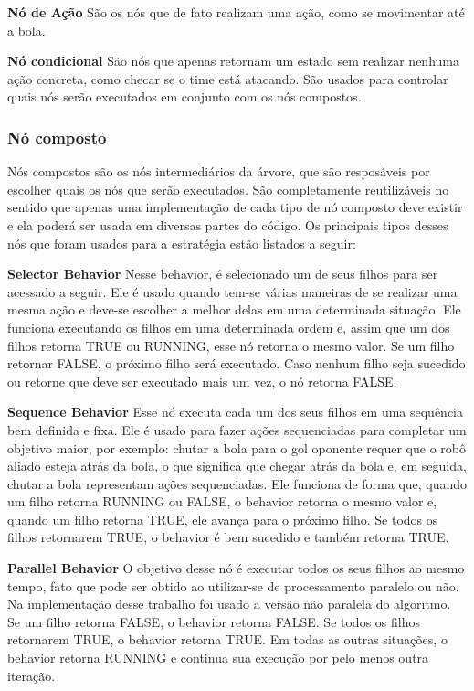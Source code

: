 \documentclass[a4paper,12pt]{article}
\begin{document}
\textbf{Nó de Ação} São os nós que de fato realizam uma ação, como se movimentar até a bola.

\textbf{Nó condicional} São nós que apenas retornam um estado sem realizar nenhuma ação concreta, como checar se o time está atacando. São usados para controlar quais nós serão executados em conjunto com os nós compostos.

\subsubsection{Nó composto}

Nós compostos são os nós intermediários da árvore, que  são resposáveis por escolher quais os nós que serão executados. São completamente reutilizáveis no sentido que apenas uma implementação de cada tipo de nó composto deve existir e ela poderá ser usada em diversas partes do código. Os principais tipos desses nós que foram usados para a estratégia estão listados a seguir:

\textbf{Selector Behavior} Nesse behavior, é selecionado um de seus filhos para ser acessado a seguir. Ele é usado quando tem-se várias maneiras de se realizar uma mesma ação e deve-se escolher a melhor delas em uma determinada situação. Ele funciona executando os filhos em uma determinada ordem e, assim que um dos filhos retorna TRUE ou RUNNING, esse nó retorna o mesmo valor. Se um filho retornar FALSE, o próximo filho será executado. Caso nenhum filho seja sucedido ou retorne que deve ser executado mais um vez, o nó retorna FALSE.

\textbf{Sequence Behavior} Esse nó executa cada um dos seus filhos em uma sequência bem definida e fixa. Ele é usado para fazer ações sequenciadas para completar um objetivo maior, por exemplo: chutar a bola para o gol oponente requer que o robô aliado esteja atrás da bola, o que significa que chegar atrás da bola e, em seguida, chutar a bola representam ações sequenciadas. Ele funciona de forma que, quando um filho retorna RUNNING ou FALSE, o behavior retorna o mesmo valor e, quando um filho retorna TRUE, ele avança para o próximo filho. Se todos os filhos retornarem TRUE, o behavior é bem sucedido e também retorna TRUE.

\textbf{Parallel Behavior} O objetivo desse nó é executar todos os seus filhos ao mesmo tempo, fato que pode ser obtido ao utilizar-se de processamento paralelo ou não. Na implementação desse trabalho foi usado a versão não paralela do algoritmo. Se um filho retorna FALSE, o behavior retorna FALSE. Se todos os filhos retornarem TRUE, o behavior retorna TRUE. Em todas as outras situações, o behavior retorna RUNNING e continua sua execução por pelo menos outra iteração.
\end{document}
